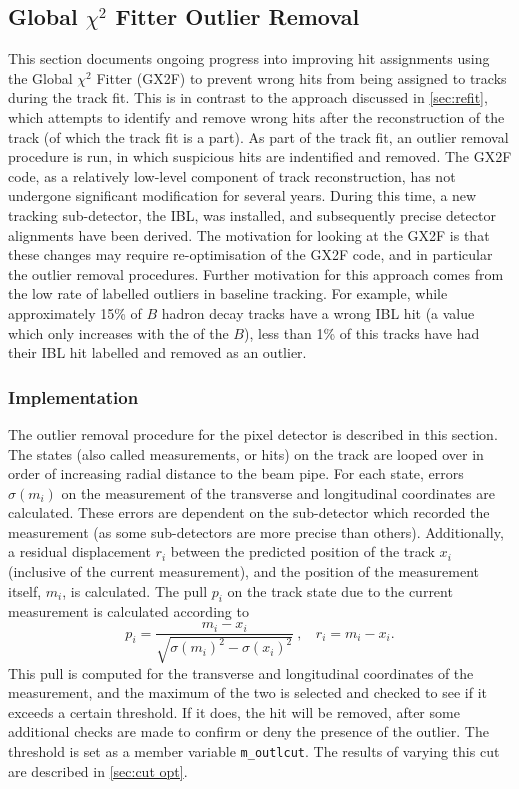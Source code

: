 \subsection{Global \texorpdfstring{$\chi^2$}{chi2} Fitter Outlier Removal}\label{sec:gx2f outlier removal}

This section documents ongoing progress into improving hit assignments using the Global $\chi^2$ Fitter (GX2F) to prevent wrong hits from being assigned to tracks during the track fit. This is in contrast to the approach discussed in \cref{sec:refit}, which attempts to identify and remove wrong hits after the reconstruction of the track (of which the track fit is a part). As part of the track fit, an outlier removal procedure is run, in which suspicious hits are indentified and removed. The GX2F code, as a relatively low-level component of track reconstruction, has not undergone significant modification for several years. During this time, a new tracking sub-detector, the IBL, was installed, and subsequently precise detector alignments have been derived. The motivation for looking at the GX2F is that these changes may require re-optimisation of the GX2F code, and in particular the outlier removal procedures. Further motivation for this approach comes from the low rate of labelled outliers in baseline tracking. For example, while approximately 15\% of $B$ hadron decay tracks have a wrong IBL hit (a value which only increases with the \pT of the $B$), less than 1\% of this tracks have had their IBL hit labelled and removed as an outlier.

\subsubsection{Implementation}
The outlier removal procedure for the pixel detector is described in this section. The states (also called measurements, or hits) on the track are looped over in order of increasing radial distance to the beam pipe. For each state, errors $\sigma(m_i)$ on the measurement of the transverse and longitudinal coordinates are calculated. These errors are dependent on the sub-detector which recorded the measurement (as some sub-detectors are more precise than others). Additionally, a residual displacement $r_i$ between the predicted position of the track $x_i$ (inclusive of the current measurement), and the position of the measurement itself, $m_i$, is calculated. The pull $p_i$ on the track state due to the current measurement is calculated according to
%
\begin{equation}
    p_i = \frac{m_i - x_i}{\sqrt{\sigma(m_i)^2 - \sigma(x_i)^2}}
    ~,~~~~ 
    r_i = m_i - x_i  .
\end{equation}
%
This pull is computed for the transverse and longitudinal coordinates of the measurement, and the maximum of the two is selected and checked to see if it exceeds a certain threshold. If it does, the hit will be removed, after some additional checks are made to confirm or deny the presence of the outlier. The threshold is set as a member variable \texttt{m\_outlcut}. The results of varying this cut are described in \cref{sec:cut opt}.


